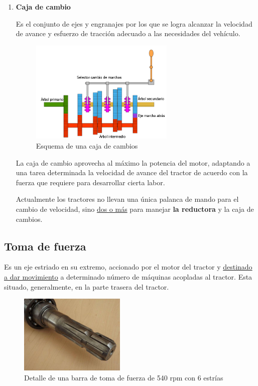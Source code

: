 \documentclass[a4paper,12pt,oneside]{book}
\begin{document}
\begin{enumerate}
\item \textbf{Caja de cambio}
\label{sec:orgedf31f1}

Es el conjunto de ejes y engranajes por los que se logra alcanzar la velocidad
de avance y esfuerzo de tracción adecuado a las necesidades del vehículo.
\begin{figure}[htbp]
\centering
\includegraphics[width=0.65\textwidth]{./img_0009/caja_cambio.jpg}
\caption{Esquema de una caja de cambios}
\end{figure}

La caja de cambio aprovecha al máximo la potencia del motor, adaptando a una
tarea determinada la velocidad de avance del tractor de acuerdo con la fuerza
que requiere para desarrollar cierta labor.

Actualmente los tractores no llevan una única palanca de mando para el cambio de
velocidad, sino \uline{dos o más} para manejar \textbf{la reductora} y la caja de cambios.
\end{enumerate}

\subsection{Toma de fuerza}
\label{sec:org13c1ea7}
Es un eje estriado en su extremo, accionado por el motor del tractor y
\uline{destinado a dar movimiento} a determinado número de máquinas acopladas al
tractor. Esta situado, generalmente, en la parte trasera del tractor.

\begin{figure}[htbp]
\centering
\includegraphics[width=0.45\textwidth]{./img_0009/toma_fuerza_2.jpg}
\caption{Detalle de una barra de toma de fuerza de 540 rpm con 6 estrías}
\end{figure}
\end{document}
